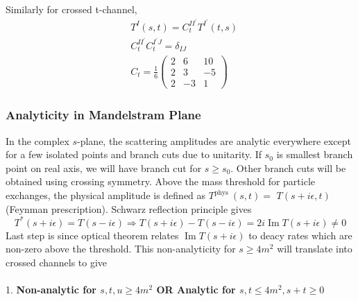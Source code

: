 ﻿\documentclass[12pt,a4paper]{article}
\begin{document}
Similarly for crossed t-channel,
$$
\begin{aligned}
&T^{I}(s, t) =C_{t}^{I I^{\prime}} T^{I^{\prime}}(t, s) \\
&C_{t}^{I I^{\prime}} C_{t}^{I^{\prime} J} =\delta_{I J} \\
&C_{t} =\frac{1}{6}\left(\begin{array}{rrr}
2 & 6 & 10 \\
2 & 3 & -5 \\
2 & -3 & 1
\end{array}\right)
\end{aligned}
$$












\subsubsection{Analyticity in Mandelstram Plane}
In the complex $s$-plane, the scattering amplitudes are analytic everywhere except for a few isolated points and branch cuts due to unitarity. If $s_{0}$ is smallest branch point on real axis, we will have branch cut for $s \geq s_{0}$. Other branch cuts will be obtained using crossing symmetry. Above the mass threshold for particle exchanges, the physical amplitude is defined as $T^{\text {phys }}(s, t)=$ $T(s+i \epsilon, t)$ (Feynman prescription). Schwarz reflection principle gives
$$
T^{*}(s+i \epsilon)=T(s-i \epsilon) \Rightarrow  T(s+i \epsilon)-T(s-i \epsilon)=2 i \operatorname{Im} T(s+i \epsilon) \neq 0
$$
Last step is since optical theorem relates $\operatorname{Im} T(s+i \epsilon)$ to deacy rates which are non-zero above the threshold. This non-analyticity for $s \geq 4m^{2}$ will translate into crossed channels to give \\\\
1. \textbf{Non-analytic for $s,t,u \geq 4m^{2}$ OR Analytic for  $s,t \leq 4m^{2}, s+t \geq 0$}
\end{document}
